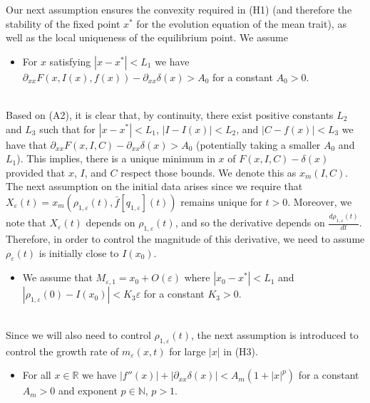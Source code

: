 \documentclass[]{article}
\theoremstyle{remark}
\begin{document}
 
Our next assumption ensures the convexity required in (H1) (and therefore the stability of the fixed point $x^{*}$ for the evolution equation of the mean trait), as well as the local uniqueness of the equilibrium point. 
We assume
 \ \\   
    \begin{itemize}
    \item[(A2)] 
    For $x$ satisfying $|x-x^{*}|<L_1$ we have $\partial_{xx}F(x,I(x),f(x))-\partial_{xx}\delta(x)>A_0$ for a constant $A_0>0$.
    
\end{itemize} 
\ \\
Based on (A2), it is clear that, by continuity, there exist positive constants $L_2$ and $L_3$ such that for $|x-x^{*}|<L_1$, $|I-I(x)|<L_2$, and $|C-f(x)|<L_3$ we have that $\partial_{xx}F(x,I,C)-\partial_{xx}\delta(x)>A_0$ (potentially taking a smaller $A_0$ and $L_1$). This implies, there is a unique minimum in $x$ of $F(x,I,C)-\delta(x)$ provided that  $x$, $I$, and $C$ respect those bounds. We denote this as $x_m(I,C)$. The next assumption on the initial data arises since we require that $X_\varepsilon(t)=x_m(\rho_{1,\varepsilon}(t),\bar{f}[q_{1,\varepsilon}](t))$ remains unique for $t>0$. Moreover, we note that $X_\varepsilon(t)$ depends on $\rho_{1,\varepsilon}(t)$, and so the derivative depends on $\frac{d\rho_{1,\varepsilon}(t)}{dt}$. Therefore, in order to control the magnitude of this derivative, we need to assume $\rho_\varepsilon(t)$ is initially close to $I(x_0)$. 
\ \\
\begin{itemize}
    \item[(A3)] We assume that
 $M_{\varepsilon,1}=x_0+O(\varepsilon)$ where $|x_0-x^{*}|<L_1$ and {$|\rho_{1,\varepsilon}(0)-I(x_0)|<K_3\varepsilon$} for a constant $K_3>0$.
\end{itemize}
\ \\
Since we will also need to control $\rho_{1,\varepsilon}(t)$, the next assumption is introduced to control the growth rate of $m_\varepsilon(x,t)$ for large $|x|$ in (H3).
\ \\
\begin{itemize}
    \item[(A4)] For all $x\in\mathbb{R}$ we have $|f''(x)|+|\partial_{xx}\delta(x)|<A_m(1+|x|^{p})$ for a constant $A_m>0$ and exponent $p\in\mathbb{N}$, $p>1$.
\end{itemize}
\end{document}

